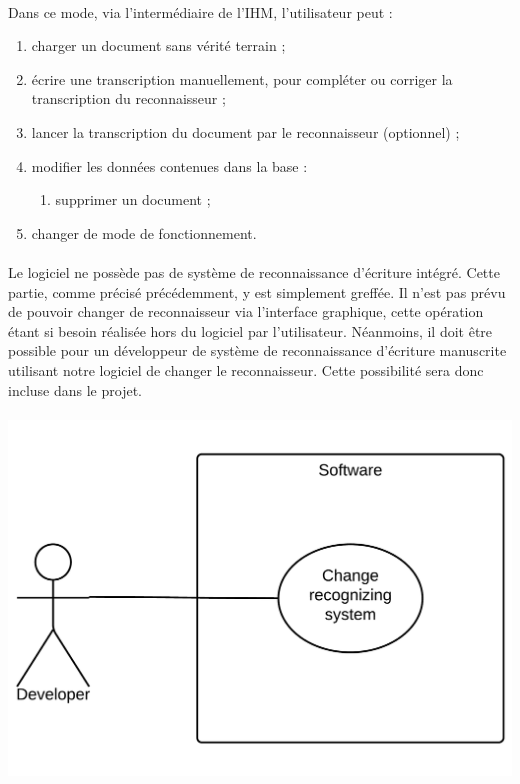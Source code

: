 \paragraph{}
Dans ce mode, via l'intermédiaire de l’IHM, l’utilisateur peut :
\begin{enumerate}
\item charger un document sans vérité terrain ;
\item écrire une transcription manuellement, pour compléter ou corriger la
transcription du reconnaisseur ;
\item lancer la transcription du document par le reconnaisseur (optionnel) ;
\item modifier les données contenues dans la base :
\begin{enumerate}
\item supprimer un document ;
\end{enumerate}
\item changer de mode de fonctionnement.
\end{enumerate}

\newpage

\paragraph{}
Le logiciel ne possède pas de système de reconnaissance d’écriture intégré.
Cette partie, comme précisé précédemment, y est simplement greffée. Il n’est
pas prévu de pouvoir changer de reconnaisseur via l’interface graphique, cette
opération étant si besoin réalisée hors du logiciel par l'utilisateur.
Néanmoins, il doit être possible pour un développeur de système de
reconnaissance d’écriture manuscrite utilisant notre logiciel de changer le
reconnaisseur. Cette possibilité sera donc incluse dans le projet.

\paragraph{}
\begin{mdframed}[frametitle={Figure 5 : Diagramme de cas d'utilisation (pour développeur)}, innerbottommargin=10]
\begin{center}
\includegraphics[scale=0.4]{Usecase_Dev.pdf}
\end{center}
\end{mdframed}

